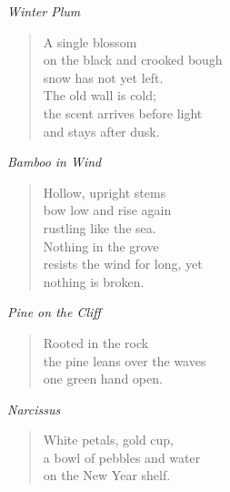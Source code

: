 \documentclass[12pt]{article}
\newcommand\poem[2]{\begin{center}\large\itshape #1\end{center}
  \begin{verse}#2\end{verse}\clearpage}
\begin{document}
\poem{Winter Plum}{A single blossom\\ on the black and crooked bough\\
  snow has not yet left.\\[1ex] The old wall is cold;\\ the scent arrives
  before light\\ and stays after dusk.}
\poem{Bamboo in Wind}{Hollow, upright stems\\ bow low and rise again\\
  rustling like the sea.\\[1ex] Nothing in the grove\\ resists the wind for
  long, yet\\ nothing is broken.}
\poem{Pine on the Cliff}{Rooted in the rock\\ the pine leans over the
  waves\\ one green hand open.}
\poem{Narcissus}{White petals, gold cup,\\ a bowl of pebbles and
  water\\ on the New Year shelf.}
\end{document}
